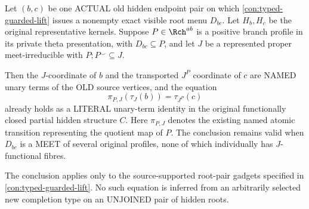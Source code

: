 \begin{lemma}
\label{lem:typed-old-source-branch-equation}
Let \((b,c)\) be one ACTUAL
old hidden endpoint pair on which
\cref{con:typed-guarded-lift}
issues a nonempty exact visible
root menu \(D_{bc}\). Let \(H_b,H_c\)
be the original representative kernels.
Suppose \(P\in\Rch^{ab}\) is a
positive branch profile in its
private theta presentation, with
\(D_{bc}\subseteq P\), and let
\(J\) be a represented proper
meet-irreducible with
\(P;P^\smile\subseteq J\).

Then the \(J\)-coordinate of
\(b\) and the transported \(J^P\)
coordinate of \(c\) are NAMED
unary terms of the OLD source
vertices, and the equation
\[
  \pi_{P,J}(\tau_J(b))
           =\tau_{J^P}(c)
\tag{TOE}\label{eq:typed-old-source-branch-equation}
\]
already holds as a LITERAL
unary-term identity in the
original functionally closed
partial hidden structure \(C\).
Here \(\pi_{P,J}\) denotes the
existing named atomic transition
representing the quotient map
of \(P\). The conclusion remains
valid when \(D_{bc}\) is a MEET
of several original profiles,
none of which individually has
\(J\)-functional fibres.

The conclusion applies only to
the source-supported root-pair
gadgets specified in
\cref{con:typed-guarded-lift}.
No such equation is inferred
from an arbitrarily selected
new completion type on an
UNJOINED pair of hidden roots.
\end{lemma}
